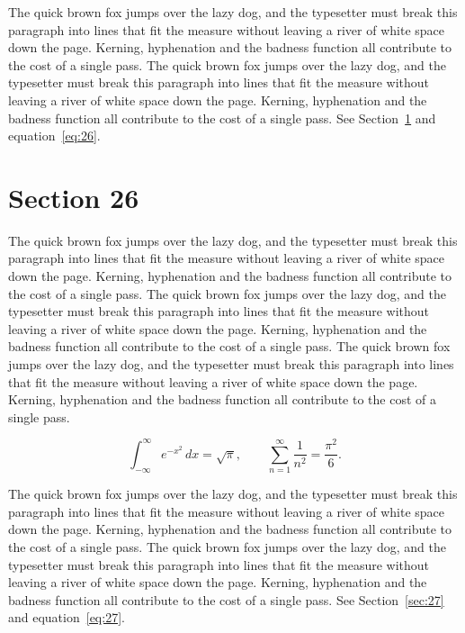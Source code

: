 \documentclass{article}
\begin{document}
The quick brown fox jumps over the lazy dog, and the typesetter must break this paragraph into lines that fit the measure without leaving a river of white space down the page. Kerning, hyphenation and the badness function all contribute to the cost of a single pass. The quick brown fox jumps over the lazy dog, and the typesetter must break this paragraph into lines that fit the measure without leaving a river of white space down the page. Kerning, hyphenation and the badness function all contribute to the cost of a single pass. 
See Section~\ref{sec:26} and equation~\eqref{eq:26}.
\section{Section 26}
\label{sec:26}
The quick brown fox jumps over the lazy dog, and the typesetter must break this paragraph into lines that fit the measure without leaving a river of white space down the page. Kerning, hyphenation and the badness function all contribute to the cost of a single pass. The quick brown fox jumps over the lazy dog, and the typesetter must break this paragraph into lines that fit the measure without leaving a river of white space down the page. Kerning, hyphenation and the badness function all contribute to the cost of a single pass. The quick brown fox jumps over the lazy dog, and the typesetter must break this paragraph into lines that fit the measure without leaving a river of white space down the page. Kerning, hyphenation and the badness function all contribute to the cost of a single pass. 

\begin{equation}\label{eq:26}
\int_{-\infty}^{\infty} e^{-x^{2}}\,dx = \sqrt{\pi}, \qquad
\sum_{n=1}^{\infty} \frac{1}{n^{2}} = \frac{\pi^{2}}{6}.
\end{equation}

The quick brown fox jumps over the lazy dog, and the typesetter must break this paragraph into lines that fit the measure without leaving a river of white space down the page. Kerning, hyphenation and the badness function all contribute to the cost of a single pass. The quick brown fox jumps over the lazy dog, and the typesetter must break this paragraph into lines that fit the measure without leaving a river of white space down the page. Kerning, hyphenation and the badness function all contribute to the cost of a single pass. 
See Section~\ref{sec:27} and equation~\eqref{eq:27}.
\end{document}
